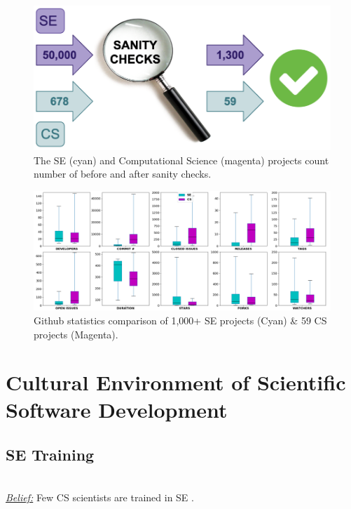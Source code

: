\documentclass[sigconf,review,anonymous]{acmart}
\begin{document}
\begin{figure}
    \centering
    \includegraphics[width=\linewidth]{img/sanity.png} 
    \caption{The SE (cyan) and Computational Science (magenta) projects count number of before and after sanity checks.}
    \label{fig:sanity}
\end{figure}

\begin{figure}[!t]
\vspace{5pt}
\centering \includegraphics[width=\linewidth]{img/comparison.png}
\caption{Github statistics comparison of 1,000+ SE projects (Cyan) \& 59 CS projects (Magenta).}\label{fig:comparison}
\end{figure}    


\section{Cultural Environment of Scientific Software Development}


\subsection{SE Training} ~\\
\noindent \textit{\underline{Belief:}} Few CS scientists are trained in SE \cite{segal07_enduser, basili08_hpc, carver13_perception, easterbrook_cs, sanders08_risk}.
\end{document}
